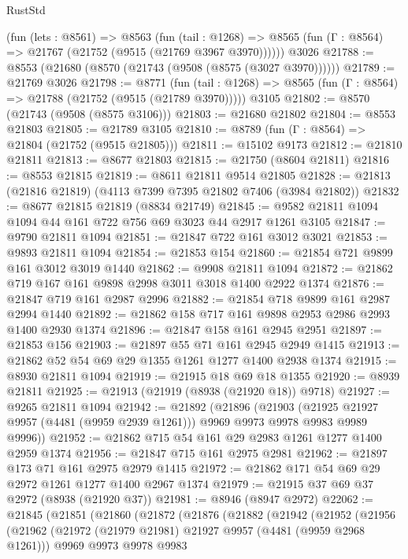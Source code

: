\begin{lexlean}{RustStd}
\begin{coremodule}
    (fun (lets : @8561) =>
    @8563
      (fun (tail : @1268) =>
      @8565 (fun (Γ : @8564) => @21767 (@21752 (@9515 (@21769 @3967 @3970))))))
    @3026
@21788 := @8553 (@21680 (@8570 (@21743 (@9508 (@8575 (@3027 @3970))))))
@21789 := @21769 @3026
@21798 := @8771
    (fun (tail : @1268) => @8565 (fun (Γ : @8564) => @21788 (@21752 (@9515 (@21789 @3970)))))
    @3105
@21802 := @8570 (@21743 (@9508 (@8575 @3106)))
@21803 := @21680 @21802
@21804 := @8553 @21803
@21805 := @21789 @3105
@21810 := @8789 (fun (Γ : @8564) => @21804 (@21752 (@9515 @21805)))
@21811 := @15102 @9173
@21812 := @21810 @21811
@21813 := @8677 @21803
@21815 := @21750 (@8604 @21811)
@21816 := @8553 @21815
@21819 := @8611 @21811 @9514 @21805
@21828 := @21813 (@21816 @21819) (@4113 @7399 @7395 @21802 @7406 (@3984 @21802))
@21832 := @8677 @21815 @21819 (@8834 @21749)
@21845 := @9582 @21811 @1094 @1094 @44 @161 @722 @756 @69 @3023 @44 @2917 @1261 @3105
@21847 := @9790 @21811 @1094
@21851 := @21847 @722 @161 @3012 @3021
@21853 := @9893 @21811 @1094
@21854 := @21853 @154
@21860 := @21854 @721 @9899 @161 @3012 @3019 @1440
@21862 := @9908 @21811 @1094
@21872 := @21862 @719 @167 @161 @9898 @2998 @3011 @3018 @1400 @2922 @1374
@21876 := @21847 @719 @161 @2987 @2996
@21882 := @21854 @718 @9899 @161 @2987 @2994 @1440
@21892 := @21862 @158 @717 @161 @9898 @2953 @2986 @2993 @1400 @2930 @1374
@21896 := @21847 @158 @161 @2945 @2951
@21897 := @21853 @156
@21903 := @21897 @55 @71 @161 @2945 @2949 @1415
@21913 := @21862 @52 @54 @69 @29 @1355 @1261 @1277 @1400 @2938 @1374
@21915 := @8930 @21811 @1094
@21919 := @21915 @18 @69 @18 @1355
@21920 := @8939 @21811
@21925 := @21913 (@21919 (@8938 (@21920 @18)) @9718)
@21927 := @9265 @21811 @1094
@21942 := @21892
    (@21896
      (@21903
        (@21925 @21927 @9957 (@4481 (@9959 @2939 @1261)))
        @9969
        @9973
        @9978
        @9983
        @9989
        @9996))
@21952 := @21862 @715 @54 @161 @29 @2983 @1261 @1277 @1400 @2959 @1374
@21956 := @21847 @715 @161 @2975 @2981
@21962 := @21897 @173 @71 @161 @2975 @2979 @1415
@21972 := @21862 @171 @54 @69 @29 @2972 @1261 @1277 @1400 @2967 @1374
@21979 := @21915 @37 @69 @37 @2972 (@8938 (@21920 @37))
@21981 := @8946 (@8947 @2972)
@22062 := @21845
    (@21851
      (@21860
        (@21872
          (@21876
            (@21882
              (@21942
                (@21952
                  (@21956
                    (@21962
                      (@21972 (@21979 @21981) @21927 @9957 (@4481 (@9959 @2968 @1261)))
                      @9969
                      @9973
                      @9978
                      @9983

\end{coremodule}
\end{lexlean}

